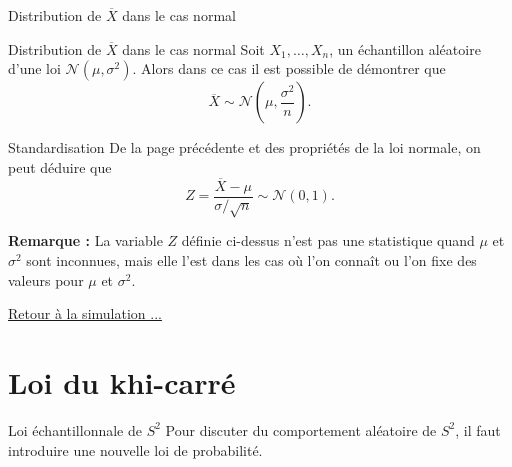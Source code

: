 \documentclass{BeamerTemplate}
\begin{document}
\begin{frame}[t]{Distribution de $\overline{X}$ dans le cas normal}
\begin{Boite}{Distribution de $\overline{X}$ dans le cas normal}
    Soit $X_1,\dots,X_n$, un échantillon aléatoire d'une loi $\mathcal{N}(\mu,\sigma^2)$. Alors dans ce cas
    il est possible de démontrer que
    $$\overline{X}\sim \mathcal{N}\left(\mu,\frac{\sigma^2}{n}\right).$$    
\end{Boite}

\end{frame}

\begin{frame}[t]{Standardisation}
  De la page précédente et des propriétés de la loi normale, on peut déduire que
  $$Z=\frac{\overline{X}-\mu}{\sigma/\sqrt{n}}\sim\mathcal{N}(0,1).$$

  \medskip

  {\bf Remarque :} La variable $Z$ définie ci-dessus n'est pas une statistique quand
  $\mu$ et $\sigma^2$ sont inconnues, mais elle l'est dans les cas où l'on connaît ou l'on
  fixe des valeurs pour $\mu$ et $\sigma^2$.

  \vspace{0.5cm}
\vfill
    \href{https://jmiron-moyechnorm.share.connect.posit.cloud/}{Retour à la simulation ...}
\end{frame}





\section{Loi du khi-carré}

\begin{frame}{Loi échantillonnale de $S^2$}
   Pour discuter du comportement aléatoire de $S^2$, il faut introduire une nouvelle loi de probabilité.
\end{frame}
\end{document}
